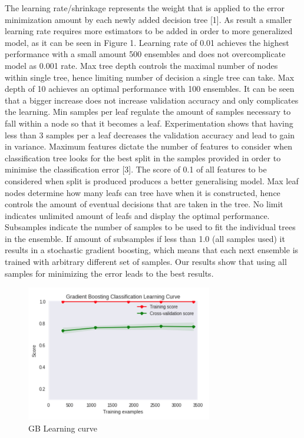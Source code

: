 The learning rate/shrinkage represents the weight that is applied to the error minimization amount by each newly added decision tree [1]. As result a smaller learning rate requires more estimators to be added in order to more generalized model, as it can be seen in Figure 1. Learning rate of 0.01 achieves the highest performance with a small amount 500 ensembles and does not overcomplicate model as 0.001 rate. Max tree depth controls the maximal number of nodes within single tree, hence limiting number of decision a single tree can take. Max depth of 10 achieves an optimal performance with 100 ensembles. It can be seen that a bigger increase does not increase validation accuracy and only complicates the learning.  Min samples per leaf regulate the amount of samples necessary to fall within a node so that it becomes a leaf. Experimentation shows that having less than 3 samples per a leaf decreases the validation accuracy and lead to gain in variance.  Maximum features dictate the number of features to consider when classification tree looks for the best split in the samples provided in order to minimise the classification error [3]. The score of 0.1 of all features to be considered when split is produced produces a better generalising model. Max leaf nodes determine how many leafs can tree have when it is constructed, hence controls the amount of eventual decisions that are taken in the tree. No limit indicates unlimited amount of leafs and display the optimal performance.  Subsamples indicate the number of samples to be used to fit the individual trees in the ensemble. If amount of subsamples if less than 1.0 (all samples used) it results in a stochastic gradient boosting, which means that each next ensemble is trained with arbitrary different set of samples. Our results show that using all samples for minimizing the error leads to the best results.

\begin{figure}[h]
\centering
\includegraphics[width=3.2in]{figures/gb_learningcurve}
\caption{GB Learning curve}
\label{fig:learningcurve}
\end{figure}

